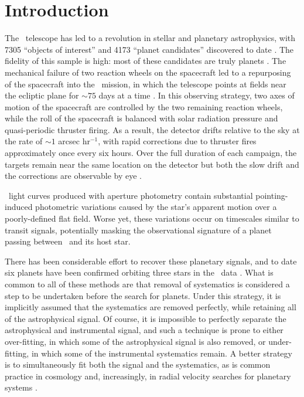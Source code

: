 

\section{Introduction}
The \kep\ telescope \citep{Borucki10} has led to a revolution in stellar and planetary
astrophysics, with 7305 ``objects of interest'' and 4173 ``planet candidates''
discovered to date \citep{Borucki11a, Borucki11b, Batalha13, Burke14, Rowe15, Mullally15}.
The fidelity of this sample is high: most of these candidates are truly planets
\citep{Morton11b, Fressin13, Desert15}.
The mechanical failure of two reaction wheels on the spacecraft led to a repurposing
of the spacecraft into the \KT\ mission, in which the telescope points at
fields near the ecliptic plane for $\sim 75$ days at a time \citep{Howell14}.
In this observing strategy, two axes of motion of the spacecraft are
controlled by the two remaining reaction wheels, while the roll of the
spacecraft is balanced with solar radiation pressure and quasi-periodic
thruster firing.
As a result, the detector drifts relative to the sky
at the rate of $\sim 1$ arcsec hr$^{-1}$, with rapid corrections due to thruster fires
approximately once every six hours.
Over the full duration of each campaign, the targets remain near the
same location on the detector but both the slow drift and the corrections are
observable by eye \citep{Barentsen15}.

\KT\ light curves produced with aperture photometry contain substantial pointing-induced
photometric variations caused by the star's apparent motion over a poorly-defined flat
field.
Worse yet, these variations occur on timescales similar to transit signals, potentially
masking the observational signature of a planet passing between \kep\ and its host star.

There has been considerable effort to recover these planetary signals, and to date six
planets have been confirmed orbiting three stars in the \KT\ data
\citep{Armstrong15b, Crossfield15, Vanderburg15}.
What is common to all of these methods are that removal of systematics is considered a
step to be undertaken before the search for planets.
Under this strategy, it is implicitly assumed that the systematics are removed perfectly,
while retaining all of the astrophysical signal.
Of course, it is impossible to perfectly separate the astrophysical and instrumental
signal, and such a technique is prone to either over-fitting, in which some of the
astrophysical signal is also removed, or under-fitting, in which some
of the instrumental systematics remain.
A better strategy is to simultaneously fit both the signal and the systematics, as is common
practice in cosmology and, increasingly, in radial velocity searches for planetary systems
\citep[e.g.][]{Ferreira00, Boisse11, Haywood14, Grunblatt15}.

